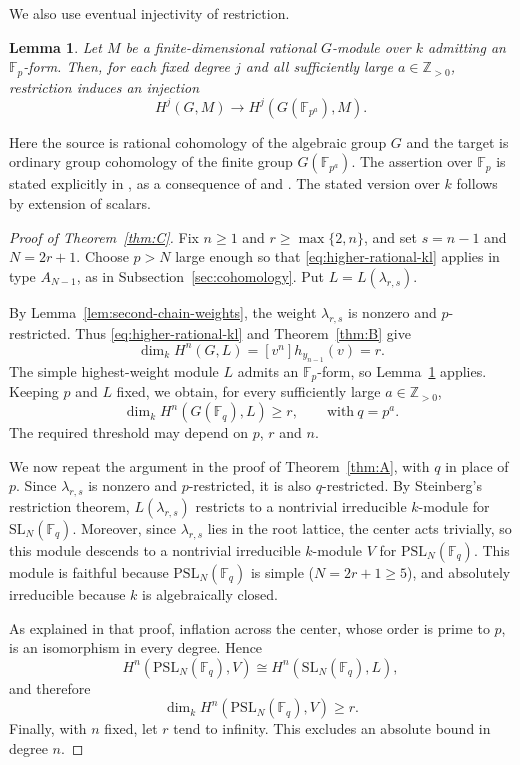 \documentclass[11pt,a4paper,reqno]{amsart}
\numberwithin{equation}{section}
\newtheorem{lemma}[theorem]{Lemma}
\theoremstyle{definition}
\theoremstyle{remark}
\theoremstyle{plain}
\begin{document}
We also use eventual injectivity of restriction.

\begin{lemma}\label{lem:eventual-injectivity}
Let $M$ be a finite-dimensional rational $G$-module over $k$
admitting an $\mathbb F_p$-form. Then, for each fixed degree
$j$ and all sufficiently large $a\in\mathbb Z_{>0}$,
restriction induces an injection
\[
H^j(G,M)\longrightarrow H^j(G(\mathbb F_{p^a}),M).
\]
\end{lemma}

Here the source is rational cohomology of the algebraic
group $G$ and the target is ordinary group cohomology
of the finite group $G(\mathbb F_{p^a})$.
The assertion over $\mathbb F_p$ is stated explicitly in \cite[Theorem~13.2]{Petrov2025}, as a consequence of \cite[Theorem~6.6]{CPSvdK1977} and \cite[Theorem~2.1]{CPS1983}. The stated version over $k$ follows by extension of scalars.

\begin{proof}[Proof of Theorem~\ref{thm:C}]
Fix $n\geq1$ and $r\geq\max\{2,n\}$, and set
$s=n-1$ and $N=2r+1$.
Choose $p>N$  large enough so that
\eqref{eq:higher-rational-kl} applies in type $A_{N-1}$,
as in Subsection~\ref{sec:cohomology}.
Put $L=L(\lambda_{r,s})$.

By Lemma~\ref{lem:second-chain-weights}, the weight
$\lambda_{r,s}$ is nonzero and $p$-restricted.
Thus \eqref{eq:higher-rational-kl} and
Theorem~\ref{thm:B} give
\[
\dim_k H^n(G,L)=[v^n]h_{y_{n-1}}(v)=r.
\]
The simple highest-weight module $L$ admits an
$\mathbb F_p$-form, so Lemma~\ref{lem:eventual-injectivity}
applies. Keeping $p$ and $L$ fixed, we obtain, for every
sufficiently large $a\in\mathbb Z_{>0}$,
\[
\dim_k H^n(G(\mathbb F_q),L)\geq r,
\qquad \mathrm{with}\  q=p^a.
\]
The required threshold may depend on $p$, $r$ and $n$.





We now repeat the argument in the proof of
Theorem~\ref{thm:A}, with $q$ in place of $p$.
Since $\lambda_{r,s}$ is nonzero and $p$-restricted, it is also $q$-restricted. By Steinberg's restriction theorem, $L(\lambda_{r,s})$ restricts to a nontrivial irreducible $k$-module for $\mathrm{SL}_N(\mathbb F_q)$. Moreover, since $\lambda_{r,s}$ lies in the root lattice, the center acts trivially, so this module descends to a nontrivial irreducible $k$-module $V$ for $\mathrm{PSL}_N(\mathbb F_q)$.
This module is faithful because $\mathrm{PSL}_N(\mathbb F_q)$
is simple ($N=2r+1\geq5$), and absolutely irreducible
because $k$ is algebraically closed.

As explained in that proof, inflation across the center,
whose order is prime to $p$, is an isomorphism in every
degree. Hence
\[
H^n(\mathrm{PSL}_N(\mathbb F_q),V)
\cong H^n(\mathrm{SL}_N(\mathbb F_q),L),
\]
and therefore
\[
\dim_k H^n(\mathrm{PSL}_N(\mathbb F_q),V)\geq r.
\]
Finally, with $n$ fixed, let $r$ tend to infinity.
This excludes an absolute bound in degree $n$.



\end{proof}
\end{document}
